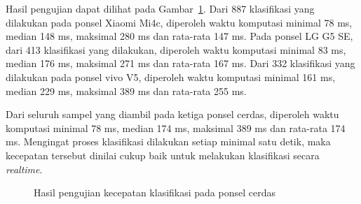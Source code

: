 Hasil pengujian dapat dilihat pada Gambar~\ref{gambar:hasil-kecepatan}. Dari 887 klasifikasi yang dilakukan pada ponsel Xiaomi Mi4c, diperoleh waktu komputasi minimal 78 ms, median 148 ms, maksimal 280 ms dan rata-rata 147 ms. Pada ponsel LG G5 SE, dari 413 klasifikasi yang dilakukan, diperoleh waktu komputasi minimal 83 ms, median 176 ms, maksimal 271 ms dan rata-rata 167 ms. Dari 332 klasifikasi yang dilakukan pada ponsel vivo V5, diperoleh waktu komputasi minimal 161 ms, median 229 ms, maksimal 389 ms dan rata-rata 255 ms.

Dari seluruh sampel yang diambil pada ketiga ponsel cerdas, diperoleh waktu komputasi minimal 78 ms, median 174 ms, maksimal 389 ms dan rata-rata 174 ms. Mengingat proses klasifikasi dilakukan setiap minimal satu detik, maka kecepatan tersebut dinilai cukup baik untuk melakukan klasifikasi secara \textit{realtime}.

\begin{figure}[h!]
    \caption{Hasil pengujian kecepatan klasifikasi pada ponsel cerdas}
    \label{gambar:hasil-kecepatan}
\end{figure}

